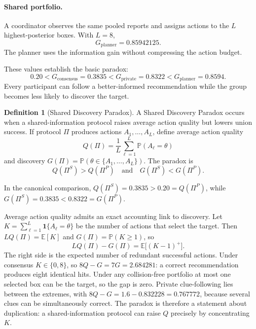 \documentclass[11pt]{article}
\theoremstyle{definition}
\newtheorem{definition}{Definition}
\theoremstyle{remark}
\newcommand{\E}{\mathbb{E}}
\newcommand{\Prob}{\mathbb{P}}
\newcommand{\1}{\mathbf{1}}
\newcommand{\priv}{\mathrm{private}}
\newcommand{\cons}{\mathrm{consensus}}
\newcommand{\plan}{\mathrm{planner}}
\begin{document}
\paragraph{Shared portfolio.}
A coordinator observes the same pooled reports and assigns actions to the $L$ highest-posterior boxes. With $L=8$,
\begin{equation}
G_{\plan}=0.85942125.
\label{eq:planner}
\end{equation}
The planner uses the information gain without compressing the action budget.

These values establish the basic paradox:
\[
0.20 < G_{\cons}=0.3835 < G_{\priv}=0.8322 < G_{\plan}=0.8594.
\]
Every participant can follow a better-informed recommendation while the group becomes less likely to discover the target.

\begin{definition}[Shared Discovery Paradox]
A Shared Discovery Paradox occurs when a shared-information protocol raises average action quality but lowers union success. If protocol $\Pi$ produces actions $A_1,\ldots,A_L$, define average action quality
\[
Q(\Pi)=\frac{1}{L}\sum_{\ell=1}^L \Prob(A_\ell=\theta)
\]
and discovery $G(\Pi)=\Prob(\theta\in\{A_1,\ldots,A_L\})$. The paradox is
\[
Q(\Pi^{S})>Q(\Pi^{P})
\quad\text{and}\quad
G(\Pi^{S})<G(\Pi^{P}).
\]
\end{definition}

In the canonical comparison, $Q(\Pi^{S})=0.3835>0.20=Q(\Pi^{P})$, while $G(\Pi^{S})=0.3835<0.8322=G(\Pi^{P})$.

Average action quality admits an exact accounting link to discovery. Let $K=\sum_{\ell=1}^{L}\1\{A_\ell=\theta\}$ be the number of actions that select the target. Then $LQ(\Pi)=\E[K]$ and $G(\Pi)=\Prob(K\ge1)$, so
\begin{equation}
LQ(\Pi)-G(\Pi)=\E\bigl[(K-1)^{+}\bigr].
\label{eq:redundancy}
\end{equation}
The right side is the expected number of redundant successful actions. Under consensus $K\in\{0,8\}$, so $8Q-G=7G=2.684281$: a correct recommendation produces eight identical hits. Under any collision-free portfolio at most one selected box can be the target, so the gap is zero. Private clue-following lies between the extremes, with $8Q-G=1.6-0.832228=0.767772$, because several clues can be simultaneously correct. The paradox is therefore a statement about duplication: a shared-information protocol can raise $Q$ precisely by concentrating $K$.
\end{document}
